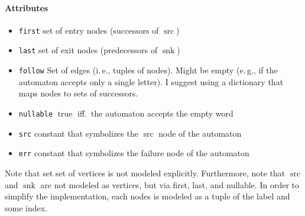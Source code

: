 \documentclass[a4paper,11pt, svgnames,titlepage]{article}
\DeclareMathOperator{\src}{src}
\DeclareMathOperator{\snk}{snk}
\newcommand{\true}{\ensuremath{\operatorname{true}}\xspace}
\begin{document}
\paragraph{Attributes}
\begin{itemize}
	\item\texttt{first} set of entry nodes (successors of $\src$)
	\item\texttt{last} set of exit nodes (predecessors of $\snk$)
	\item\texttt{follow} Set of edges (i.\,e., tuples of nodes). Might be empty (e.\,g., if the automaton accepts only a single letter). I suggest using a dictionary that maps nodes to sets of successors. 
	\item\texttt{nullable} \true iff.\ the automaton accepts the empty word
	\item\texttt{src} constant that symbolizes the $\src$ node of the automaton
	\item\texttt{err} constant that symbolizes the failure node of the automaton	
\end{itemize}
Note that set set of vertices is not modeled explicitly. Furthermore, note that $\src$ and $\snk$ are not modeled as vertices, but via first, last, and nullable. In order to simplify the implementation, each nodes is modeled as a tuple of the label and some index.
\end{document}
